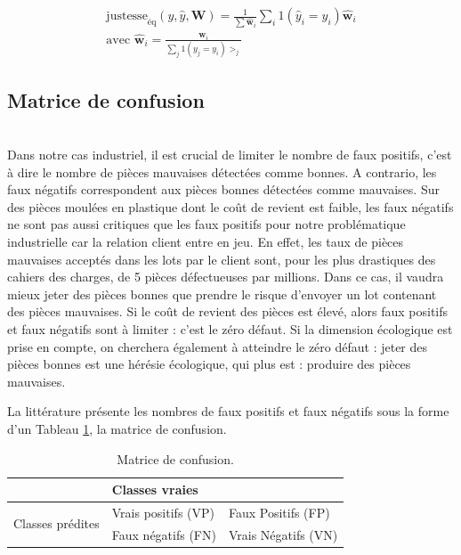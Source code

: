 \begin{equation} \label{eq:balanced_accuracy}
\begin{split}
\text{justesse}_{\text{éq}}(y, \hat{y}, \mathbf{W})=\frac{1}{\sum \hat{\mathbf{w}}_{i}} \sum_{i} 1\left(\hat{y}_{i}=y_{i}\right) \hat{\mathbf{w}}_{i}
\\
\text{avec } \hat{\mathbf{w}}_{i}=\frac{\mathbf{w}_{i}}{\sum_{j} 1\left(y_{j}=y_{i}\right) >_{j}}
\end{split}
\end{equation}

\subsection{Matrice de confusion}\mbox{} \\
Dans notre cas industriel, il est crucial de limiter le nombre de faux positifs, c'est à dire le nombre de pièces mauvaises détectées comme bonnes.
A contrario, les faux négatifs correspondent aux pièces bonnes détectées comme mauvaises.
Sur des pièces moulées en plastique dont le coût de revient est faible, les faux négatifs ne sont pas aussi critiques que les faux positifs pour notre problématique industrielle car la relation client entre en jeu.
En effet, les taux de pièces mauvaises acceptés dans les lots par le client sont, pour les plus drastiques des cahiers des charges, de 5 pièces défectueuses par millions.
Dans ce cas, il vaudra mieux jeter des pièces bonnes que prendre le risque d'envoyer un lot contenant des pièces mauvaises.
Si le coût de revient des pièces est élevé, alors faux positifs et faux négatifs sont à limiter : c'est le zéro défaut.
Si la dimension écologique est prise en compte, on cherchera également à atteindre le zéro défaut : jeter des pièces bonnes est une hérésie écologique, qui plus est : produire des pièces mauvaises.

La littérature présente les nombres de faux positifs et faux négatifs sous la forme d'un Tableau \ref{tab:confusion_matrix}, la matrice de confusion.

\begin{table}[]
	\centering
	\begin{tabular}{l|l|l|}
		\cline{2-3}
		& \multicolumn{2}{l|}{Classes vraies}               \\ \hline
		\multicolumn{1}{|l|}{\multirow{2}{*}{Classes prédites}} & Vrais positifs (VP) & Faux Positifs (FP)  \\ \cline{2-3} 
		\multicolumn{1}{|l|}{}                            & Faux négatifs (FN)  & Vrais Négatifs (VN) \\ \hline
	\end{tabular}
	\caption{Matrice de confusion.}
	\label{tab:confusion_matrix}
\end{table}

